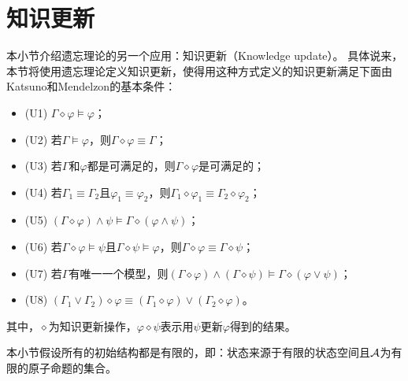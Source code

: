 \section{知识更新}\label{chapter04:sec:update}
本小节介绍遗忘理论的另一个应用：知识更新（Knowledge update）。
具体说来，本节将使用遗忘理论定义知识更新，使得用这种方式定义的知识更新满足下面由Katsuno和Mendelzon的基本条件：
\begin{itemize}
	\item (U1)  $\Gamma \diamond \varphi \models \varphi$；
	\item (U2) 若$\Gamma \models \varphi$，则$\Gamma \diamond \varphi \equiv \Gamma$；
	\item (U3) 若$\Gamma$和$\varphi$都是可满足的，则$\Gamma \diamond \varphi$是可满足的；
	\item (U4) 若$\Gamma_1\equiv \Gamma_2$且$\varphi_1 \equiv \varphi_2$，则$\Gamma_1 \diamond \varphi_1 \equiv \Gamma_2 \diamond \varphi_2$；
	\item (U5) $(\Gamma \diamond \varphi) \wedge \psi \models \Gamma \diamond(\varphi \wedge \psi)$；
	\item (U6) 若$\Gamma \diamond \varphi \models \psi$且$\Gamma \diamond \psi \models \varphi$，则$\Gamma \diamond \varphi \equiv \Gamma \diamond \psi$；
	\item (U7) 若$\Gamma$有唯一一个模型，则$(\Gamma \diamond \varphi) \wedge (\Gamma \diamond \psi) \models \Gamma \diamond (\varphi \vee \psi)$；
	\item (U8) $(\Gamma_1 \vee \Gamma_2) \diamond \varphi \equiv (\Gamma_1 \diamond \varphi) \vee  (\Gamma_2 \diamond \varphi)$。
\end{itemize}
其中，$\diamond$为知识更新操作，$\varphi \diamond \psi$表示用$\psi$更新$\varphi$得到的结果。

本小节假设所有的初始结构都是有限的，即：状态来源于有限的状态空间且${\cal A}$为有限的原子命题的集合。

%	


